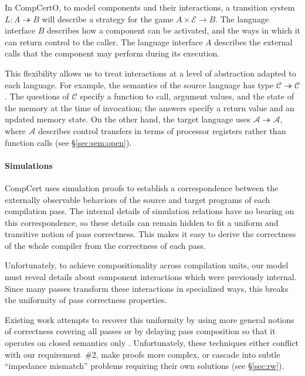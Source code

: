 \documentclass[sigplan,screen]{acmart}
\begin{document}
In CompCertO,
to model components and their interactions,
a transition system $L : A \twoheadrightarrow B$
will describe a strategy
for the game
$A \times \mathcal{E} \rightarrow B$.
The language interface $B$ describes how a component can be activated,
and the ways in which it can return control to the caller.
The language interface $A$ describes the external calls that the component
may perform during its execution.

This flexibility allows us to treat interactions
at a level of abstraction adapted to each language.
For example,
the semantics of
the source language  has type
\mbox{$\mathcal{C} \twoheadrightarrow \mathcal{C}$}.
The questions of $\mathcal{C}$ specify a function to call,
argument values,
and the state of the memory at the time of invocation;
the answers specify a return value and an updated memory state.
On the other hand, the target language  uses
$\mathcal{A} \twoheadrightarrow \mathcal{A}$,
where $\mathcal{A}$ describes control transfers
in terms of processor registers
rather than function calls (see \S\ref{sec:sem:open}).



\paragraph{Simulations} %

CompCert uses simulation proofs
to establish a correspondence between
the externally observable behaviors of
the source and target programs of each compilation pass.
The internal details of simulation relations
have no bearing on this correspondence,
so these details can remain hidden
to fit a uniform and transitive notion of pass correctness.
This makes it easy to derive the correctness
of the whole compiler
from the correctness of each pass.

Unfortunately,
to achieve compositionality across compilation units,
our model must reveal details
about component interactions
which were previously internal.
Since many passes transform
these interactions in
specialized ways,
this breaks the uniformity
of pass correctness properties.

Existing work attempts to recover this uniformity
by using more general notions of correctness
covering all passes
\cite{compcompcert,compcertm}
or by delaying pass composition so that
it operates on closed semantics only
\cite{sepcompcert,compcertm}.
Unfortunately, these techniques either
conflict with our requirement~\#2,
make proofs more complex,
or cascade into subtle ``impedance mismatch'' problems
requiring their own solutions
(see \S\ref{sec:rw}).
\end{document}
